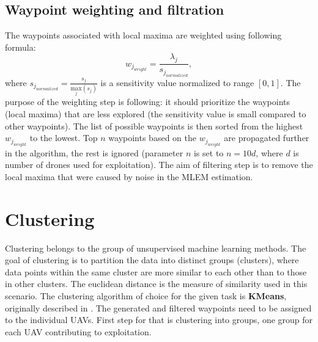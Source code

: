 \subsection{Waypoint weighting and filtration}
The waypoints associated with local maxima are weighted using following formula:
\begin{equation}
  w_{j_{weight}} = \frac{\lambda_{j}}{    s_{j_{normalized}} },
\end{equation}
where $s_{j_{normalized}} = \frac{ s_{j} }{ \underset{j}{\mathrm{max}}(s_{j})}$ is a sensitivity value normalized to range $[0, 1]$.
The purpose of the weighting step is following: it should prioritize the waypoints (local maxima) that are less explored (the sensitivity value is small compared to other waypoints).
The list of possible waypoints is then sorted from the highest $w_{j_{weight}}$ to the lowest.
Top $n$ waypoints based on the $w_{j_{weight}}$ are propagated further in the algorithm, the rest is ignored (parameter $n$ is set to $n = 10d$, where $d$ is number of drones used for exploitation).
The aim of filtering step is to remove the local maxima that were caused by noise in the \ac{MLEM} estimation.%

\section{Clustering}%
Clustering belongs to the group of unsupervised machine learning methods.
The goal of clustering is to partition the data into distinct groups (clusters), where data points within the same cluster are more similar to each other than to those in other clusters.
The euclidean distance is the measure of similarity used in this scenario.
The clustering algorithm of choice for the given task is \textbf{KMeans}, originally described in \cite{kmeans}.
The generated and filtered waypoints need to be assigned to the individual \ac{UAV}s. 
First step for that is clustering into groups, one group for each \ac{UAV} contributing to exploitation.

